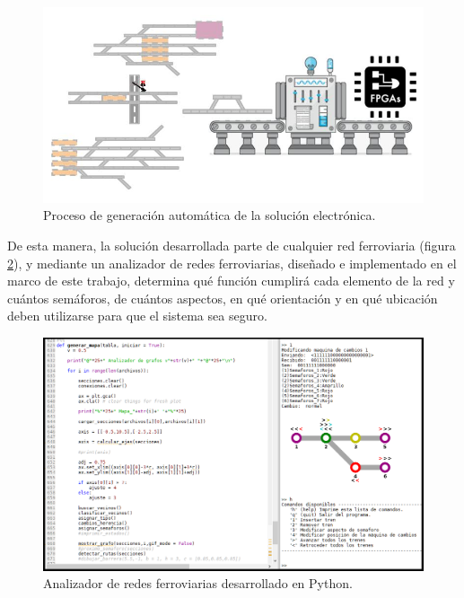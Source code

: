 		\begin{figure}[htbp!]
			\centering
			\includegraphics[scale=.45]{./Figures/Generacion}
			\caption{Proceso de generación automática de la solución electrónica.}
			\label{fig:Generacion}
		\end{figure}
		
		\vspace{10cm}
		
		
		De esta manera, la solución desarrollada parte de cualquier red ferroviaria (figura \ref{fig:Spyder}), y mediante un analizador de redes ferroviarias, diseñado e implementado en el marco de este trabajo, determina qué función cumplirá cada elemento de la red y cuántos semáforos, de cuántos aspectos, en qué orientación y en qué ubicación deben utilizarse para que el sistema sea seguro.
		
		\begin{figure}[htbp!]
			\centering
			\includegraphics[scale=.4]{./Figures/Spyder}
			\caption{Analizador de redes ferroviarias desarrollado en Python.}
			\label{fig:Spyder}
		\end{figure}
				
